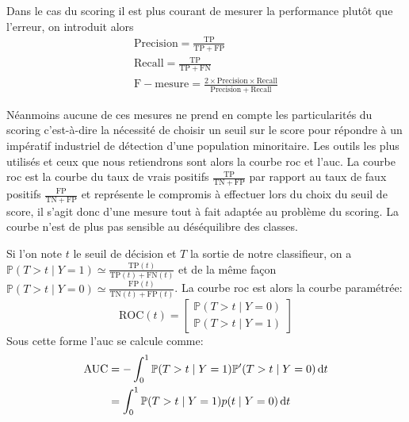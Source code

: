 Dans le cas du scoring il est plus courant de mesurer la performance plutôt que l'erreur, on introduit alors
\begin{gather*}
    \mathrm{Precision} = \frac{\mathrm{TP}}{\mathrm{TP} + \mathrm{FP}} \\
    \mathrm{Recall} = \frac{\mathrm{TP}}{\mathrm{TP} + \mathrm{FN}} \\
    \mathrm{F-mesure} = \frac{2 \times \mathrm{Precision} \times \mathrm{Recall}}{\mathrm{Precision} + \mathrm{Recall}}
\end{gather*}

Néanmoins aucune de ces mesures ne prend en compte les particularités du scoring c'est-à-dire la nécessité de choisir un seuil sur le score pour répondre à un impératif industriel de détection d'une population minoritaire.
Les outils les plus utilisés et ceux que nous retiendrons sont alors la courbe \ac{roc} et l'\ac{auc}. La courbe \ac{roc} est la courbe du taux de vrais positifs $\frac{\mathrm{TP}}{\mathrm{TN}+\mathrm{FP}}$ par rapport au taux de faux positifs $\frac{\mathrm{FP}}{\mathrm{TN}+\mathrm{FP}}$ et représente le compromis à effectuer lors du choix du seuil de score, il s'agit donc d'une mesure tout à fait adaptée au problème du scoring. La courbe n'est de plus pas sensible au déséquilibre des classes.

Si l'on note $t$ le seuil de décision et $T$ la sortie de notre classifieur, on a $\mathbb{P} ( T > t \mid Y = 1 ) \simeq \frac{\mathrm{TP} (t) }{\mathrm{TP} (t) + \mathrm{FN} (t) } $ et de la même façon $\mathbb{P} ( T > t \mid Y = 0 ) \simeq \frac{\mathrm{FP} (t)}{\mathrm{TN} (t) +\mathrm{FP} (t)} $. La courbe \ac{roc} est alors la courbe paramétrée:
\begin{equation*}
    \mathrm{ROC} (t) = \begin{bmatrix}
        \mathbb{P} ( T > t \mid Y = 0 ) \\
        \mathbb{P} ( T > t \mid Y = 1 )
    \end{bmatrix}
\end{equation*}
Sous cette forme l'\ac{auc} se calcule comme:
\begin{align*}
    \mathrm{AUC} &=  - \int_0^1 \mathbb{P} ( T > t \mid Y = 1 ) \mathbb{P}' ( T > t \mid Y = 0 ) \mathop{}\!\mathrm{d} t \\
    &= \int_0^1 \mathbb{P} ( T > t \mid Y = 1 ) p ( t \mid Y = 0 ) \mathop{}\!\mathrm{d} t
\end{align*}



